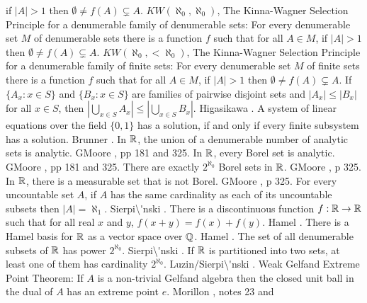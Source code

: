 if $|A| > 1$  then $\emptyset\neq f(A)\subsetneq A$.
\medskip
{} $KW(\aleph_0,\aleph_0)$, The Kinna-Wagner
Selection Principle for a denumerable family of denumerable sets: For
every denumerable set $M$ of denumerable sets there is a function $f$ such
that for all $A\in M$, if $|A| > 1$ then $\emptyset\neq f(A)\subsetneq A$.
\medskip
{} $KW(\aleph_0,<\aleph_0)$, The Kinna-Wagner
Selection Principle for a denumerable family of finite sets: For every
denumerable set $M$ of finite sets there is a function $f$ such that for
all $A\in M$, if $|A| > 1$ then $\emptyset\neq f(A)\subsetneq A$.
\medskip
{} If $\{A_{x}: x\in S\}$ and $\{B_{x}:
x\in S\}$ are families  of pairwise disjoint sets and $ |A_{x}|
\le |B_{x}|$ for all $x\in S$, then $|\bigcup_{x\in S}A_{x}|
\le |\bigcup_{x\in S} B_{x}|$. \ac{Higasikawa} \cite{1995}.
\medskip
{} A system of linear equations over the field
$\{0,1\}$ has a solution, if and only if every finite subsystem has
a solution. \ac{Brunner} \cite{1999}.
\medskip
{} In $\Bbb R$, the union of a denumerable
number of analytic sets is analytic.  G\. \ac{Moore} \cite{1982},
pp 181 and 325.
\medskip
{} In $\Bbb R$, every Borel set is analytic.
G\. \ac{Moore} \cite{1982}, pp 181 and 325.
\medskip
{} There are exactly $2^{\aleph_0}$ Borel sets
in $\Bbb R$.  G\. \ac{Moore} \cite{1982}, p 325.
\medskip
{} In $\Bbb R$, there is a measurable set
that is not Borel.  G\. \ac{Moore} \cite{1982}, p 325.
\medskip
{}  For every uncountable set $A$, if $A$ has the
same cardinality as each of its uncountable subsets then
$|A| = \aleph_1$.  \ac{Sierpi\'nski} \cite{1918}.
\medskip
{}  There is a discontinuous function $f: \Bbb R
\to\Bbb R$ such that for all real $x$ and $y$, $f(x+y)=f(x)+f(y)$.
\ac{Hamel} \cite{1905}.
\medskip
{} There is a Hamel basis for $\Bbb R$ as a
vector space over $\Bbb Q$.  \ac{Hamel} \cite{1905}.
\medskip
{} The set of all denumerable subsets of
$\Bbb R$ has power $2^{\aleph_0}$.  \ac{Sierpi\'nski} \cite{1917}.
\medskip
{} If $\Bbb R$ is partitioned into two sets, at
least one of them has cardinality $2^{\aleph_0}$. \ac{Luzin/Sierpi\'nski}
\cite{1917}.
\medskip
{} Weak Gelfand Extreme Point Theorem: If $A$ is
a non-trivial Gelfand algebra then the closed unit ball in the dual
of $A$ has an extreme point $e$.  \ac{Morillon} \cite{1986}, notes 23 and
